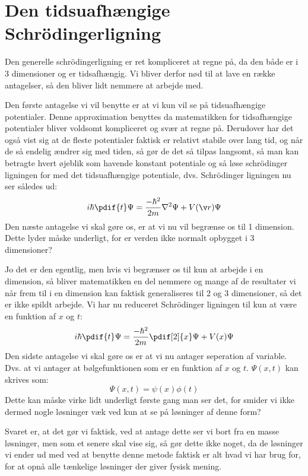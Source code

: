 
\section{Den tidsuafhængige Schrödingerligning}
Den generelle schrödingerligning er ret kompliceret at regne på, da den både er i 3 dimensioner og er tidsafhængig. Vi bliver derfor nød til at lave en række antagelser, så den bliver lidt nemmere at arbejde med.

Den første antagelse vi vil benytte er at vi kun vil se på tidsuafhængige potentialer. Denne approximation benyttes da matematikken for tidsafhængige potentialer bliver voldsomt kompliceret og svær at regne på. Derudover har det også vist sig at de fleste potentialer faktisk er relativt stabile over lang tid, og når de så endelig ændrer sig med tiden, så gør de det så tilpas langsomt, så man kan betragte hvert øjeblik som havende konstant potentiale og så løse schrödinger ligningen for med det tidsuafhængige potentiale, dvs. Schrödinger ligningen nu ser således ud:
\begin{equation*}
    i\hbar\pdif{t} \Psi =\frac{-\hbar^{2}}{2m}\nabla^{2}\Psi+V(\v r)\Psi
\end{equation*}
Den næste antagelse vi skal gøre os, er at vi nu vil begrænse os til 1 dimension. Dette lyder måske underligt, for er verden ikke normalt opbygget i 3 dimensioner?

Jo det er den egentlig, men hvis vi begrænser os til kun at arbejde i en dimension, så bliver matematikken en del nemmere og mange af de resultater vi når frem til i en dimension kan faktisk generaliseres til 2 og 3 dimensioner, så det er ikke spildt arbejde. Vi har nu reduceret Schrödinger ligningen til kun at være en funktion af $x$ og $t$:
\begin{equation*}
    i\hbar\pdif{t} \Psi=\frac{-\hbar^{2}}{2m}\pdif[2]{x} \Psi+V(x)\Psi
\end{equation*}
Den sidste antagelse vi skal gøre os er at vi nu antager seperation af variable. Dvs. at vi antager at bølgefunktionen som er en funktion af $x$ og $t$. $\Psi(x,t)$ kan skrives som: 
\begin{equation}
\Psi(x,t)=\psi(x)\phi(t)
\label{kvant:eq:tsep}
\end{equation}
Dette kan måske virke lidt underligt første gang man ser det, for smider vi ikke dermed nogle løsninger væk ved kun at se på løsninger af denne form?

Svaret er, at det gør vi faktisk, ved at antage dette ser vi bort fra en masse løsninger, men som et senere skal vise sig, så gør dette ikke noget, da de løsninger vi ender ud med ved at benytte denne metode faktisk er alt hvad vi har brug for, for at opnå alle tænkelige løsninger der giver fysisk mening. 

